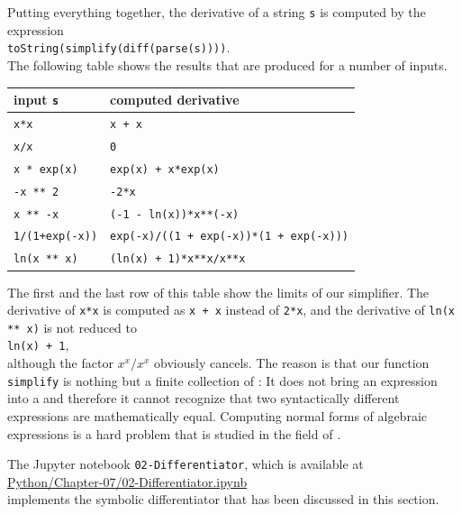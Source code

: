 \noindent
Putting everything together, the derivative of a string \texttt{s} is computed by the expression
\\[0.2cm]
\hspace*{1.3cm}
\texttt{toString(simplify(diff(parse(s))))}.
\\[0.2cm]
The following table shows the results that are produced for a number of inputs.
\begin{center}
\begin{tabular}{|l|l|}
\hline
\textbf{input \texttt{s}} & \textbf{computed derivative} \\
\hline
\texttt{x*x}           & \texttt{x + x}                                        \\
\texttt{x/x}           & \texttt{0}                                            \\
\texttt{x * exp(x)}    & \texttt{exp(x) + x*exp(x)}                            \\
\texttt{-x ** 2}       & \texttt{-2*x}                                         \\
\texttt{x ** -x}       & \texttt{(-1 - ln(x))*x**(-x)}                         \\
\texttt{1/(1+exp(-x))} & \texttt{exp(-x)/((1 + exp(-x))*(1 + exp(-x)))}        \\
\texttt{ln(x ** x)}    & \texttt{(ln(x) + 1)*x**x/x**x}                        \\
\hline
\end{tabular}
\end{center}

\remarkEng
The first and the last row of this table show the limits of our simplifier.  The derivative of \texttt{x*x} is
computed as \texttt{x + x} instead of \texttt{2*x}, and the derivative of \texttt{ln(x ** x)} is not
reduced to
\\[0.2cm]
\hspace*{1.3cm}
\texttt{ln(x) + 1},
\\[0.2cm]
although the factor $x^x/x^x$ obviously cancels.  The reason is that our
function \texttt{simplify} is nothing but a finite collection of :  It does not bring
an expression into a  and therefore it cannot recognize that two syntactically different
expressions are mathematically equal.  Computing normal forms of algebraic expressions is a hard problem
that is studied in the field of .  \eox

The Jupyter notebook \texttt{02-Differentiator}, which is available at
\\[0.2cm]
\hspace*{1.3cm}
\href{https://github.com/karlstroetmann/Formal-Languages/blob/master/Python/Chapter-07/02-Differentiator.ipynb}{Python/Chapter-07/02-Differentiator.ipynb}
\\[0.2cm]
implements the symbolic differentiator that has been discussed in this section.

